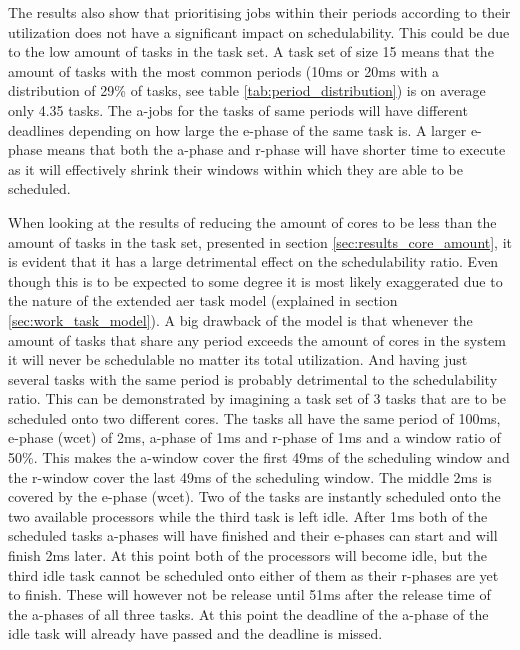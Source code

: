 \documentclass{kththesis}
\begin{document}
The results also show that prioritising jobs within their periods according to their utilization
does not have a significant impact on schedulability. This could be due to the low amount of tasks
in the task set. A task set of size 15 means that the amount of tasks with the most common periods
(10ms or 20ms with a distribution of 29\% of tasks, see table \ref{tab:period_distribution}) is on
average only 4.35 tasks. The \acrshort{a}-jobs for the tasks of same periods will have different
deadlines depending on how large the \acrshort{e}-phase of the same task is. A larger
\acrshort{e}-phase means that both the \acrshort{a}-phase and \acrshort{r}-phase will have shorter
time to execute as it will effectively shrink their windows within which they are able to be
scheduled.

When looking at the results of reducing the amount of cores to be less than the amount of tasks in
the task set, presented in section \ref{sec:results_core_amount}, it is evident that it has a large
detrimental effect on the schedulability ratio. Even though this is to be expected to some degree it
is most likely exaggerated due to the nature of the extended \acrshort{aer} task model (explained in
section \ref{sec:work_task_model}). A big drawback of the model is that whenever the amount of tasks
that share any period exceeds the amount of cores in the system it will never be schedulable no
matter its total utilization. And having just several tasks with the same period is probably
detrimental to the schedulability ratio. This can be demonstrated by imagining a task set of 3 tasks
that are to be scheduled onto two different cores. The tasks all have the same period of 100ms,
\acrshort{e}-phase (\acrshort{wcet}) of 2ms, \acrshort{a}-phase of 1ms and \acrshort{r}-phase of 1ms
and a window ratio of 50\%. This makes the \acrshort{a}-window cover the first 49ms of the
scheduling window and the \acrshort{r}-window cover the last 49ms of the scheduling window. The
middle 2ms is covered by the \acrshort{e}-phase (\acrshort{wcet}). Two of the tasks are instantly
scheduled onto the two available processors while the third task is left idle. After 1ms both of the
scheduled tasks \acrshort{a}-phases will have finished and their \acrshort{e}-phases can start and
will finish 2ms later. At this point both of the processors will become idle, but the third idle task
cannot be scheduled onto either of them as their \acrshort{r}-phases are yet to finish. These will
however not be release until 51ms after the release time of the \acrshort{a}-phases of all three
tasks. At this point the deadline of the \acrshort{a}-phase of the idle task will already have
passed and the deadline is missed.
\end{document}

